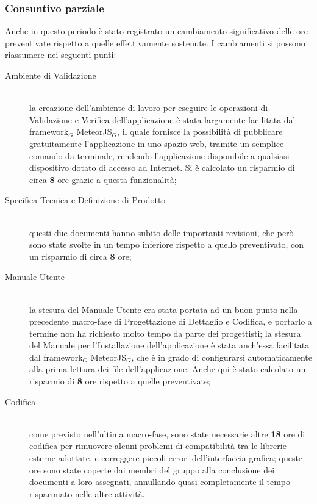 \subsubsection{Consuntivo parziale}
Anche in questo periodo è stato registrato un cambiamento significativo delle ore preventivate rispetto a quelle effettivamente sostenute. I cambiamenti si possono riassumere nei seguenti punti:
\begin{description}
\item[Ambiente di Validazione] \hfill \\
la creazione dell'ambiente di lavoro per eseguire le operazioni di Validazione e Verifica dell'applicazione è stata largamente facilitata dal framework$_G$ MeteorJS$_G$, il quale fornisce la possibilità di pubblicare gratuitamente l'applicazione in uno spazio web, tramite un semplice comando da terminale, rendendo l'applicazione disponibile a qualsiasi dispositivo dotato di accesso ad Internet. Si è calcolato un risparmio di circa \textbf{8} ore grazie a questa funzionalità;
\item[Specifica Tecnica e Definizione di Prodotto] \hfill \\
questi due documenti hanno subito delle importanti revisioni, che però sono state svolte in un tempo inferiore rispetto a quello preventivato, con un risparmio di circa \textbf{8} ore;
\item[Manuale Utente] \hfill \\
la stesura del Manuale Utente era stata portata ad un buon punto nella precedente macro-fase di Progettazione di Dettaglio e Codifica, e portarlo a termine non ha richiesto molto tempo da parte dei progettisti; la stesura del Manuale per l'Installazione dell'applicazione è stata anch'essa facilitata dal framework$_G$ MeteorJS$_G$, che è in grado di configurarsi automaticamente alla prima lettura dei file dell'applicazione. Anche qui è stato calcolato un risparmio di \textbf{8} ore rispetto a quelle preventivate; 
\item[Codifica] \hfill \\
come previsto nell'ultima macro-fase, sono state necessarie altre \textbf{18} ore di codifica per rimuovere alcuni problemi di compatibilità tra le librerie esterne adottate, e correggere piccoli errori dell'interfaccia grafica; queste ore sono state coperte dai membri del gruppo alla conclusione dei documenti a loro assegnati, annullando quasi completamente il tempo risparmiato nelle altre attività.
\end{description}

